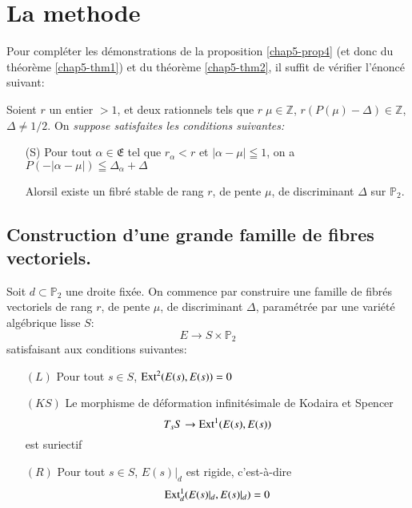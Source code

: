 \section{La methode}\label{chap5-sec7}

Pour compl\'eter les d\'emonstrations de la
proposition \ref{chap5-prop4} (et donc du\break
th\'eor\`eme \ref{chap5-thm1}) et du th\'eor\`eme \ref{chap5-thm2}, il
suffit de v\'erifier l'\'enonc\'e suivant: 

\begin{theorem}\label{chap5-thm3}
Soient $r$ un entier $>1$, et deux rationnels tels que
$r\; \mu\in \mathbb{Z}$, $r(P(\mu)-\Delta)\in \mathbb{Z}$, $\Delta\neq
1/2$. On {\em suppose satisfaites les conditions suivantes:} 
\begin{itemize}
\item[(S)] Pour tout $\alpha\in \mathfrak{E}$ tel que $r_{\alpha}<r$
et $|\alpha-\mu|\leqq 1$, on a
$P(-|\alpha-\mu|)\leqq \Delta_{\alpha}+\Delta$ 

Alors\pageoriginale il existe un fibr\'e stable de rang $r$, de pente
$\mu$, de discriminant $\Delta$ sur $\mathbb{P}_{2}$. 
\end{itemize}
\end{theorem}

\subsection{Construction d'une grande famille de fibres vectoriels.}\label{chap5-sec7.1}

Soit $d\subset \mathbb{P}_{2}$ une droite fix\'ee. On commence par
construire une famille de fibr\'es vectoriels de rang $r$, de pente
$\mu$, de discriminant $\Delta$, param\'etr\'ee par une vari\'et\'e
alg\'ebrique lisse $S$:  
$$
E\to S\times \mathbb{P}_{2}
$$
satisfaisant aux conditions suivantes:

\begin{itemize}
\item[$(L)$] Pour tout $s\in S$, $\operatorname{Ext}^{2}(E(s),E(s))=0$

\item[$(KS)$] Le morphisme de d\'eformation infinit\'esimale de
Kodaira et Spen\-cer
$$
T_{s}S\to \operatorname{Ext}^{1}(E(s),E(s))
$$
est suriectif

\item[$(R)$] Pour tout $s\in S$, $E(s)|_{d}$ est rigide, c'est-\`a-dire
$$
\operatorname{Ext}^{1}_{d}(E(s)|_{d},E(s)|_{d})=0
$$
\end{itemize}

